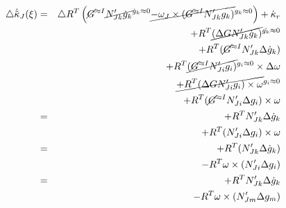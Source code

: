 \begin{eqnarray*}
\triangle\dot{\tilde{\kappa}}_{J}(\xi) & = & \triangle R^{T}\left(\cancel{G}^{\approx I}\cancel{N_{Jk}'\dot{g}_{k}}^{\dot{g}_{k}\approx0}\cancel{-\omega_{J}\times(\cancel{G}^{\approx I}N_{Jk}'g_{k})}^{g_{k}\approx0}\right)+\dot{\kappa}_{r}\\
 &  & +R^{T}\cancel{(\Delta GN_{Jk}'\dot{g}_{k})}^{\dot{g_{k}}\approx0}\\
 &  & +R^{T}(\cancel{G}^{\approx I}N_{Jk}'\Delta\dot{g}_{k})\\
 &  & +R^{T}\cancel{(\cancel{G}^{\approx I}N_{Ji}'g_{i})}^{g_{i}\approx0}\times\Delta\omega\\
 &  & \cancel{+R^{T}(\Delta GN_{Ji}'g_{i})\times\omega}^{g_{i}\approx0}\\
 &  & +R^{T}(\cancel{G}^{\approx I}N_{Ji}'\Delta g_{i})\times\omega\\
 & = & +R^{T}N_{Jk}'\Delta\dot{g}_{k}\\
 &  & +R^{T}(N_{Ji}'\Delta g_{i})\times\omega\\
 & = & +R^{T}(N_{Jk}'\Delta\dot{g}_{k})\\
 &  & -R^{T}\omega\times(N_{Ji}'\Delta g_{i})\\
 & = & +R^{T}N_{Jk}'\Delta\dot{g}_{k}\\
 &  & -R^{T}\omega\times(N_{Jm}'\Delta g_{m})
\end{eqnarray*}




